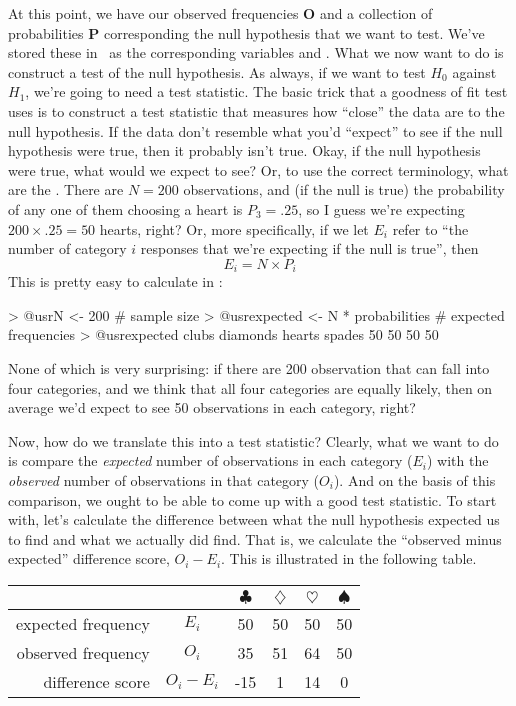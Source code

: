 At this point, we have our observed frequencies $\bm{O}$ and a collection of probabilities $\bm{P}$ corresponding the null hypothesis that we want to test. We've stored these in \R\ as the corresponding variables  and . What we now want to do is construct a test of the null hypothesis. As always, if we want to test $H_0$ against $H_1$, we're going to need a test statistic. The basic trick that a goodness of fit test uses is to construct a test statistic that measures how ``close'' the data are to the null hypothesis. If the data don't resemble what you'd ``expect'' to see if the null hypothesis were true, then it probably isn't true. Okay, if the null hypothesis were true, what would we expect to see? Or, to use the correct terminology, what are the . There are $N=200$ observations, and (if the null is true) the probability of any one of them choosing a heart is $P_3 = .25$, so I guess we're expecting $200 \times .25 = 50$ hearts, right? Or, more specifically, if we let $E_i$ refer  to ``the number of category $i$ responses that we're expecting if the null is true'', then
$$
E_i = N \times P_i
$$
This is pretty easy to calculate in \R:
\begin{rblock1}
> @usr{N <- 200}  # sample size
> @usr{expected <- N * probabilities} # expected frequencies
> @usr{expected}
   clubs diamonds   hearts   spades 
      50       50       50       50 
\end{rblock1}
None of which is very surprising: if there are 200 observation that can fall into four categories, and we think that all four categories are equally likely, then on average we'd expect to see 50 observations in each category, right?

Now, how do we translate this into a test statistic? Clearly, what we want to do is compare the {\it expected} number of observations in each category ($E_i$) with the {\it observed} number of observations in that category ($O_i$). And on the basis of this comparison, we ought to be able to come up with a good test statistic. To start with, let's calculate the difference between what the null hypothesis expected us to find and what we actually did find. That is, we calculate the ``observed minus expected'' difference score, $O_i - E_i$. This is illustrated in the following table. 

\begin{center}
\begin{tabular}{rc|cccc}
& & $\clubsuit$ & $\diamondsuit$ & $\heartsuit$ & $\spadesuit$ \\ \hline 
expected frequency &$E_i$ & 50 & 50 & 50 & 50 \\ 
observed frequency &$O_i$ & 35 & 51 & 64 & 50 \\ 
difference score & $O_i - E_i$ & -15 & 1 & 14 & 0 \\
\end{tabular}
\end{center}

